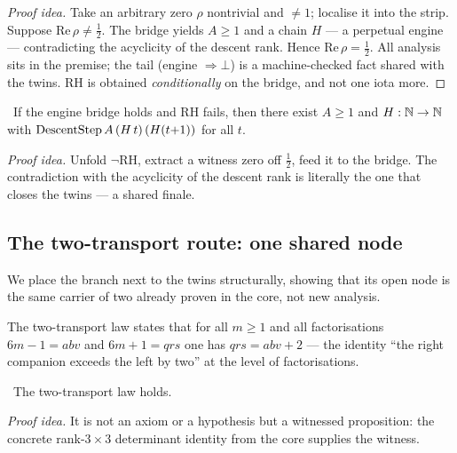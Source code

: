 \begin{proof}[Proof idea]
Take an arbitrary zero $\rho$ nontrivial and $\ne 1$; localise it into the strip. Suppose
$\mathrm{Re}\,\rho \ne \tfrac12$. The bridge yields $A\ge1$ and a chain $H$ --- a perpetual engine
--- contradicting the acyclicity of the descent rank. Hence $\mathrm{Re}\,\rho = \tfrac12$. All
analysis sits in the premise; the tail (engine $\Rightarrow \bot$) is a machine-checked fact shared
with the twins. RH is obtained \emph{conditionally} on the bridge, and not one iota more.
\end{proof}

\begin{theorem}\label{thm:not_RH_gives_engine}
\green{}\ If the engine bridge holds and RH fails, then there exist $A\ge 1$ and $H:\mathbb{N}\to\mathbb{N}$ with
$\operatorname{DescentStep} A\,(H\,t)\,(H(t{+}1))$ for all $t$. 
\end{theorem}

\emph{Proof idea.} Unfold $\neg\mathrm{RH}$, extract a witness zero off $\tfrac12$, feed it to the
bridge. The contradiction with the acyclicity of the descent rank is literally the one that closes
the twins --- a shared finale.

\subsection{The two-transport route: one shared node}

We place the branch next to the twins structurally, showing that its open node is the same carrier
of two already proven in the core, not new analysis.

\begin{definition}\label{def:TwoTransportLaw}
The two-transport law states that for all $m\ge1$ and all factorisations
$6m-1 = a b v$ and $6m+1 = q r s$ one has $q r s = a b v + 2$ --- the identity ``the right companion
exceeds the left by two'' at the level of factorisations. 
\end{definition}

\begin{theorem}\label{thm:twoTransportLaw_holds}
\green{}\ The two-transport law holds. 
\end{theorem}

\emph{Proof idea.} It is not an axiom or a hypothesis but a witnessed proposition: the concrete
rank-$3{\times}3$ determinant identity from the core supplies the witness.

